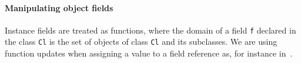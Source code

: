 \paragraph{Manipulating object fields}
Instance fields are treated as functions, where the domain of a field \texttt{f} 
declared in the class \texttt{Cl} is the set of objects of class \texttt{Cl} and its subclasses.
We are using function updates when assigning a value to a field reference as, for instance in~\cite{B00ppp}.




